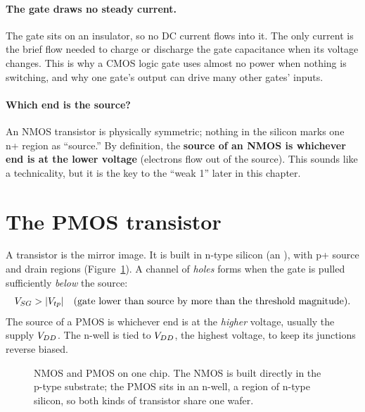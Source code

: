 \paragraph{The gate draws no steady current.} The gate sits on an insulator, so no DC current flows into it. The only current is the brief flow needed to charge or discharge the gate capacitance when its voltage changes. This is why a CMOS logic gate uses almost no power when nothing is switching, and why one gate's output can drive many other gates' inputs.

\paragraph{Which end is the source?} An NMOS transistor is physically symmetric; nothing in the silicon marks one n+ region as ``source.'' By definition, the \textbf{source of an NMOS is whichever end is at the lower voltage} (electrons flow out of the source). This sounds like a technicality, but it is the key to the ``weak 1'' later in this chapter.

\section{The PMOS transistor}

A  transistor is the mirror image. It is built in n-type silicon (an ), with p+ source and drain regions (Figure~\ref{fig:cmoswell}). A channel of \emph{holes} forms when the gate is pulled sufficiently \emph{below} the source:
\[
  V_{SG} > |V_{tp}| \quad \text{(gate lower than source by more than the threshold magnitude)}.
\]
The source of a PMOS is whichever end is at the \emph{higher} voltage, usually the supply $V_{DD}$. The n-well is tied to $V_{DD}$, the highest voltage, to keep its junctions reverse biased.

\begin{figure}[h]
\centering
{}
\caption{NMOS and PMOS on one chip. The NMOS is built directly in the p-type substrate; the PMOS sits in an n-well, a region of n-type silicon, so both kinds of transistor share one wafer.}
\label{fig:cmoswell}
\end{figure}

